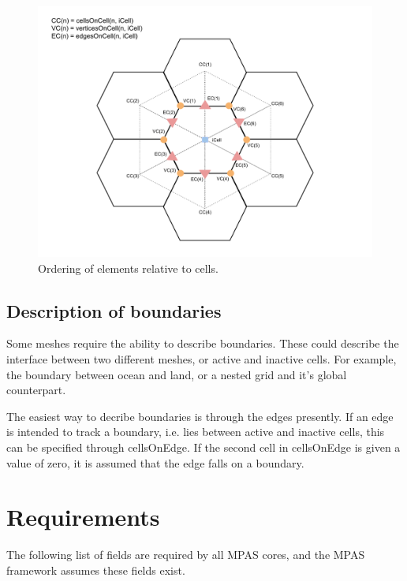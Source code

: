 \documentclass[11pt]{report}
\begin{document}
\begin{figure}[htp!]
	\centering
	\includegraphics[scale=0.4]{figures/CellDiagram.pdf}
	\caption{Ordering of elements relative to cells.}
\end{figure}



\section{Description of boundaries}

Some meshes require the ability to describe boundaries. These could describe
the interface between two different meshes, or active and inactive cells. For
example, the boundary between ocean and land, or a nested grid and it's global
counterpart.

The easiest way to decribe boundaries is through the edges presently. If an
edge is intended to track a boundary, i.e. lies between active and inactive
cells, this can be specified through cellsOnEdge. If the second cell in
cellsOnEdge is given a value of zero, it is assumed that the edge falls on a
boundary.

\chapter{Requirements}

The following list of fields are required by all MPAS cores, and the MPAS framework assumes these fields exist.
\end{document}
